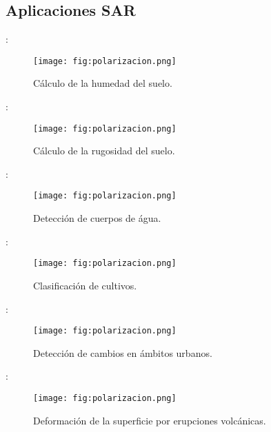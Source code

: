 \subsection{Aplicaciones SAR}

\begin{frame}{\secname : \subsecname}
  \begin{figure}
    \centering
    \texttt{[image: fig:polarizacion.png]}
    \caption{Cálculo de la humedad del suelo.}
    \label{}
  \end{figure}
\end{frame}

\begin{frame}{\secname : \subsecname}
  \begin{figure}
    \centering
    \texttt{[image: fig:polarizacion.png]}
    \caption{Cálculo de la rugosidad del suelo.}
    \label{}
  \end{figure}
\end{frame}

\begin{frame}{\secname : \subsecname}
  \begin{figure}
    \centering
    \texttt{[image: fig:polarizacion.png]}
    \caption{Detección de cuerpos de água.}
    \label{}
  \end{figure}
\end{frame}

\begin{frame}{\secname : \subsecname}
  \begin{figure}
    \centering
    \texttt{[image: fig:polarizacion.png]}
    \caption{Clasificación de cultivos.}
    \label{}
  \end{figure}
\end{frame}

\begin{frame}{\secname : \subsecname}
  \begin{figure}
    \centering
    \texttt{[image: fig:polarizacion.png]}
    \caption{Detección de cambios en ámbitos urbanos.}
    \label{}
  \end{figure}
\end{frame}

\begin{frame}{\secname : \subsecname}
  \begin{figure}
    \centering
    \texttt{[image: fig:polarizacion.png]}
    \caption{Deformación de la superficie por erupciones volcánicas.}
    \label{}
  \end{figure}
\end{frame}


